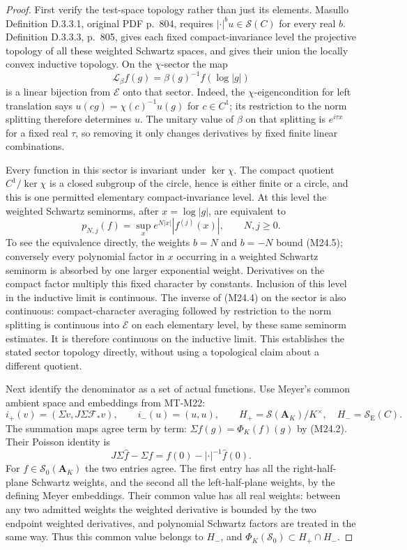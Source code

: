 \begin{proof}
First verify the test-space topology rather than just its elements.
Masullo Definition D.3.3.1, original PDF p.~804, requires
$|\cdot|^b u\in\mathcal S(C)$ for every real $b$.
Definition D.3.3.3, p.~805, gives each fixed compact-invariance
level the projective topology of all these weighted Schwartz spaces,
and gives their union the locally convex inductive topology.
On the $\chi$-sector the map
\[
 \mathcal L_\beta f(g)=\beta(g)^{-1}f(\log|g|)
 \tag{M24.4}
\]
is a linear bijection from $\mathcal E$ onto that sector.
Indeed, the $\chi$-eigencondition for left translation says
$u(cg)=\chi(c)^{-1}u(g)$ for $c\in C^1$; its restriction to
the norm splitting therefore determines $u$. The unitary value
of $\beta$ on that splitting is $e^{i\tau x}$ for a fixed real
$\tau$, so removing it only changes derivatives by fixed finite
linear combinations.

Every function in this sector is invariant under $\ker\chi$.
The compact quotient $C^1/\ker\chi$ is a closed subgroup of the
circle, hence is either finite or a circle, and this is one permitted
elementary compact-invariance level. At this level the weighted
Schwartz seminorms, after $x=\log|g|$, are equivalent to
\[
 p_{N,j}(f)=\sup_x e^{N|x|}|f^{(j)}(x)|,
 \qquad N,j\ge0.
 \tag{M24.5}
\]
To see the equivalence directly, the weights $b=N$ and $b=-N$
bound (M24.5); conversely every polynomial factor in $x$ occurring
in a weighted Schwartz seminorm is absorbed by one larger
exponential weight. Derivatives on the compact factor multiply
this fixed character by constants. Inclusion of this level in the
inductive limit is continuous. The inverse of (M24.4) on the
sector is also continuous: compact-character averaging followed
by restriction to the norm splitting is continuous into
$\mathcal E$ on each elementary level, by these same seminorm
estimates. It is therefore continuous on the inductive limit.
This establishes the stated sector topology directly, without
using a topological claim about a different quotient.

Next identify the denominator as a set of actual functions.
Use Meyer's common ambient space and embeddings from MT-M22:
\[
 i_+(v)=(\Sigma v,J\Sigma\mathcal F_*v),
 \qquad i_-(u)=(u,u),
 \qquad H_+=\mathcal S(\mathbf A_K)/K^\times,
 \quad H_-=\mathcal S_{\mathrm E}(C).
\]
The summation maps agree term by term:
$\Sigma f(g)=\Phi_K(f)(g)$ by (M24.2).
Their Poisson identity is
\[
 J\Sigma\widehat f-\Sigma f
      =f(0)-|\cdot|^{-1}\widehat f(0).
 \tag{M24.6}
\]
For $f\in\mathcal S_0(\mathbf A_K)$ the two entries agree.
The first entry has all the right-half-plane Schwartz weights,
and the second all the left-half-plane weights, by the defining
Meyer embeddings. Their common value has all real weights:
between any two admitted weights the weighted derivative is
bounded by the two endpoint weighted derivatives, and polynomial
Schwartz factors are treated in the same way. Thus this common
value belongs to $H_-$, and
$\Phi_K(\mathcal S_0)\subset H_+\cap H_-$.


\end{proof}
